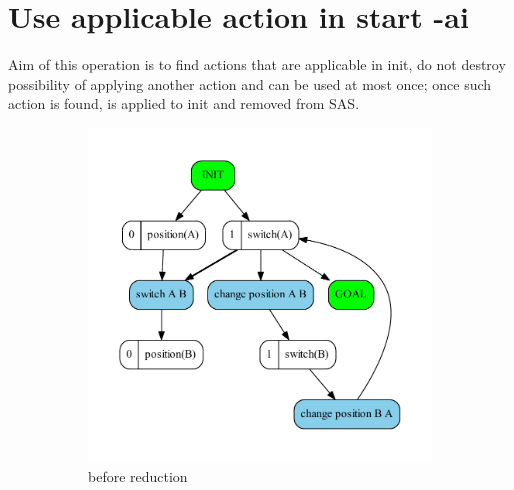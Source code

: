 \chapter{Use applicable action in start -ai}

Aim of this operation is to find actions that are applicable in init, do not destroy possibility of applying another action and can be used at most once; once such action is found, is applied to init and removed from SAS. 

\begin{figure}
	\begin{subfigure}[b]{0.4\textwidth}
		\includegraphics[scale=0.4]{useApplicableActionInStart/figures/applyOnlyOne_input}
		\caption{before reduction}
	\end{subfigure}	
	\begin{subfigure}[b]{0.4\textwidth}

\end{subfigure}
\end{figure}
